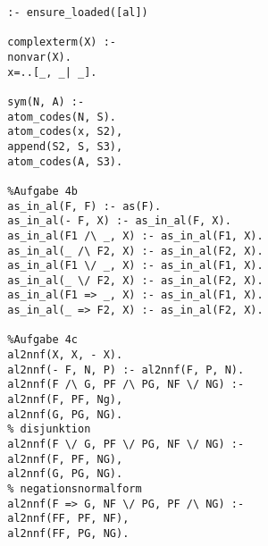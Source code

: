 \documentclass[a4paper,10pt]{article}
\begin{document}
		\begin{verbatim}
		:- ensure_loaded([al])
		
		complexterm(X) :-
		nonvar(X).
		x=..[_, _| _].
		
		sym(N, A) :-
		atom_codes(N, S).
		atom_codes(x, S2),
		append(S2, S, S3),
		atom_codes(A, S3).
		
		%Aufgabe 4b
		as_in_al(F, F) :- as(F).
		as_in_al(- F, X) :- as_in_al(F, X).
		as_in_al(F1 /\ _, X) :- as_in_al(F1, X).
		as_in_al(_ /\ F2, X) :- as_in_al(F2, X).
		as_in_al(F1 \/ _, X) :- as_in_al(F1, X).
		as_in_al(_ \/ F2, X) :- as_in_al(F2, X).
		as_in_al(F1 => _, X) :- as_in_al(F1, X).
		as_in_al(_ => F2, X) :- as_in_al(F2, X).
		
		%Aufgabe 4c
		al2nnf(X, X, - X).
		al2nnf(- F, N, P) :- al2nnf(F, P, N).
		al2nnf(F /\ G, PF /\ PG, NF \/ NG) :-
		al2nnf(F, PF, Ng),
		al2nnf(G, PG, NG).
		% disjunktion
		al2nnf(F \/ G, PF \/ PG, NF \/ NG) :-
		al2nnf(F, PF, NG),
		al2nnf(G, PG, NG).
		% negationsnormalform
		al2nnf(F => G, NF \/ PG, PF /\ NG) :-
		al2nnf(FF, PF, NF),
		al2nnf(FF, PG, NG).
		\end{verbatim}
\end{document}

